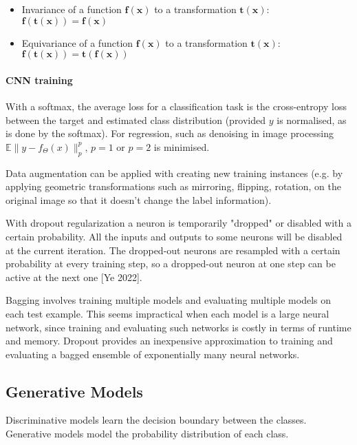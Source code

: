 \begin{itemize}
    \item Invariance of a function $\bm{f}(\bm{x})$ to a transformation $\bm{t}(\bm{x})$: $\bm{f}( \bm{t}(\bm{x}) ) = \bm{f}(\bm{x})$
    \item Equivariance of a function $\bm{f}(\bm{x})$ to a transformation $\bm{t}(\bm{x})$: $\bm{f}( \bm{t}(\bm{x}) ) = \bm{t}( \bm{f}(\bm{x}) )$
\end{itemize}

\paragraph{CNN training}

With a softmax, the average loss for a classification task is the cross-entropy loss between the target and estimated class distribution (provided $y$ is normalised, as is done by the softmax).
For regression, such as denoising in image processing $\mathbb{E} \lVert y - f_\Theta(x) \rVert_p^p, \, p=1 \text{ or } p=2$ is minimised.

Data augmentation can be applied with creating new training instances
(e.g. by applying geometric transformations such as mirroring, flipping,
rotation, on the original image so that it doesn't change the label
information).

With dropout regularization a neuron is temporarily "dropped" or
disabled with a certain probability. All the inputs and outputs to some
neurons will be disabled at the current iteration. The dropped-out
neurons are resampled with a certain probability at every training step,
so a dropped-out neuron at one step can be active at the next one [Ye
2022].

Bagging involves training multiple models and evaluating multiple models on each test example.
This seems impractical when each model is a large neural network, since training and evaluating such networks is costly in terms of runtime and memory.
Dropout provides an inexpensive approximation to training and evaluating a bagged ensemble of exponentially many neural networks.


\newpage
\subsection{Generative Models}

Discriminative models learn the decision boundary between the classes.
Generative models model the probability distribution of each class.


